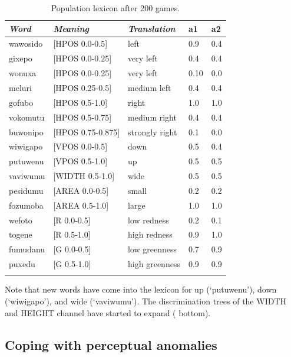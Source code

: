 \begin{table}
\begin{center}
\begin{tabular}{ l  l  l  l  l }
\lsptoprule
{\itshape Word}&{\itshape Meaning}&{\itshape Translation} & {\bfshape a1}&{\bfshape a2} \\ \midrule
wawosido & [HPOS 0.0-0.5] &left&0.9&0.4\\ 
gixepo & [HPOS 0.0-0.25] & very left&0.4&0.4\\ 
wonuxa & [HPOS 0.0-0.25] & very left&0.10&0.0\\ 
meluri & [HPOS 0.25-0.5] &medium left&0.4&0.4\\ 
gofubo & [HPOS 0.5-1.0]& right&1.0&1.0\\ 
vokomutu & [HPOS 0.5-0.75] &medium right&0.4&0.4\\ 
buwonipo & [HPOS 0.75-0.875] &strongly right&0.1&0.0\\ 
wiwigapo & [VPOS 0.0-0.5] &down&0.5&0.4\\ 
putuwenu & [VPOS 0.5-1.0]&up & 0.5&0.5\\ 
vaviwumu & [WIDTH 0.5-1.0]&wide & 0.5&0.5\\ 
pesidumu & [AREA 0.0-0.5]&small& 0.2&0.2\\ 
fozumoba & [AREA 0.5-1.0]&large & 1.0&1.0\\ 
wefoto & [R 0.0-0.5]& low redness &0.2&0.1\\ 
togene & [R 0.5-1.0]& high redness &0.9&1.0\\ 
fumudanu & [G 0.0-0.5]& low greenness &0.7&0.9\\ 
puxedu & [G 0.5-1.0]& high greenness &0.9&0.9\\ 
\lspbottomrule
\end{tabular}
\caption{ \label{tab:upper} Population lexicon after 200 games.}
\end{center}
\end{table}
Note that new words have come into the lexicon 
for up (`putuwenu'), down (`wiwigapo'), and 
wide (`vaviwumu'). The discrimination trees of 
the WIDTH and HEIGHT channel have started to 
expand ( bottom). 

\subsection{Coping with perceptual anomalies}


